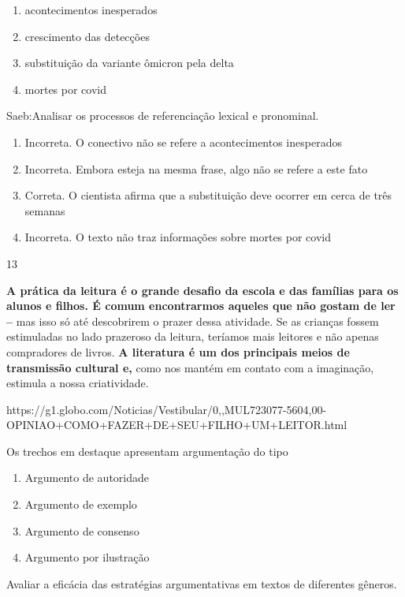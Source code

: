 {{\begin{escolha}
{\begin{itemize}
\begin{itemize}
\begin{enumerate}
\def\labelenumi{\alph{enumi})}
\item
  acontecimentos inesperados
\item
  crescimento das detecções
\item
  substituição da variante ômicron pela delta
\item
  mortes por covid
\end{enumerate}

Saeb:Analisar os processos de referenciação lexical e pronominal.

\begin{enumerate}
\def\labelenumi{\arabic{enumi}.}
\item
  Incorreta. O conectivo não se refere a acontecimentos inesperados
\item
  Incorreta. Embora esteja na mesma frase, algo não se refere a este
  fato
\item
  Correta. O cientista afirma que a substituição deve ocorrer em cerca
  de três semanas
\item
  Incorreta. O texto não traz informações sobre mortes por covid
\end{enumerate}

\num{13}

\textbf{A prática da leitura é o grande desafio da escola e das famílias
para os alunos e filhos. É comum encontrarmos aqueles que não gostam de
ler --} mas isso só até descobrirem o prazer dessa atividade. Se as
crianças fossem estimuladas no lado prazeroso da leitura, teríamos mais
leitores e não apenas compradores de livros. \textbf{A literatura é um
dos principais meios de transmissão cultural e,} como nos mantém em
contato com a imaginação, estimula a nossa criatividade.

https://g1.globo.com/Noticias/Vestibular/0,,MUL723077-5604,00-OPINIAO+COMO+FAZER+DE+SEU+FILHO+UM+LEITOR.html

Os trechos em destaque apresentam argumentação do tipo

\begin{enumerate}
\def\labelenumi{\alph{enumi})}
\item
  Argumento de autoridade
\item
  Argumento de exemplo
\item
  Argumento de consenso
\item
  Argumento por ilustração
\end{enumerate}

Avaliar a eficácia das estratégias argumentativas em textos de
diferentes gêneros.


\end{itemize}
\end{itemize}}
\end{escolha}}}
